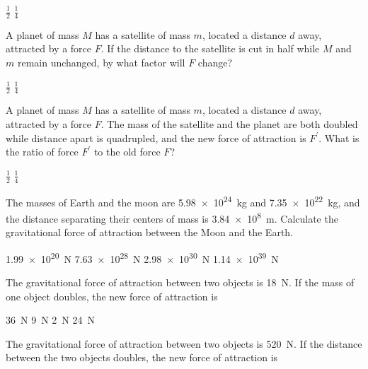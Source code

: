 \documentclass[]{exam}
\theoremstyle{definition}
\begin{document}
\begin{questions}
\begin{randomizechoices}
    \choice $\frac{1}{2}$
    \choice $\frac{1}{4}$
\end{randomizechoices}

\question
A planet of mass $M$ has a satellite of mass $m$, located a distance $d$ away, attracted by a force $F$. If the distance to the satellite is cut in half while $M$ and $m$ remain unchanged, by what factor will $F$ change?

\begin{randomizechoices}
    \choice $\frac{1}{2}$
    \choice $\frac{1}{4}$
\end{randomizechoices}

\question
A planet of mass $M$ has a satellite of mass $m$, located a distance $d$ away, attracted by a force $F$. The mass of the satellite and the planet are both doubled while distance apart is quadrupled, and the new force of attraction is $F^\prime$. What is the ratio of force $F^\prime$ to the old force $F$?

\begin{randomizechoices}
    \choice $\frac{1}{2}$
    \correctchoice $\frac{1}{4}$
\end{randomizechoices}

\question
The masses of Earth and the moon are \SI{5.98e24}{kg} and \SI{7.35e22}{kg}, and the distance separating their centers of mass is \SI{3.84e8}{m}. Calculate the gravitational force of attraction between the Moon and the Earth.

\begin{randomizechoices}
    \correctchoice \SI{1.99e20}{N}
    \choice \SI{7.63e28}{N}
    \choice \SI{2.98e30}{N}
    \choice \SI{1.14e39}{N}
\end{randomizechoices}

\question
The gravitational force of attraction between two objects is \SI{18}{N}. If the mass of one object doubles, the new force of attraction is

\begin{randomizechoices}
    \correctchoice \SI{36}{N}
    \choice \SI{9}{N}
    \choice \SI{2}{N}
    \choice \SI{24}{N}
\end{randomizechoices}

\question
The gravitational force of attraction between two objects is \SI{520}{N}. If the distance between the two objects doubles, the new force of attraction is


\end{questions}
\end{document}
